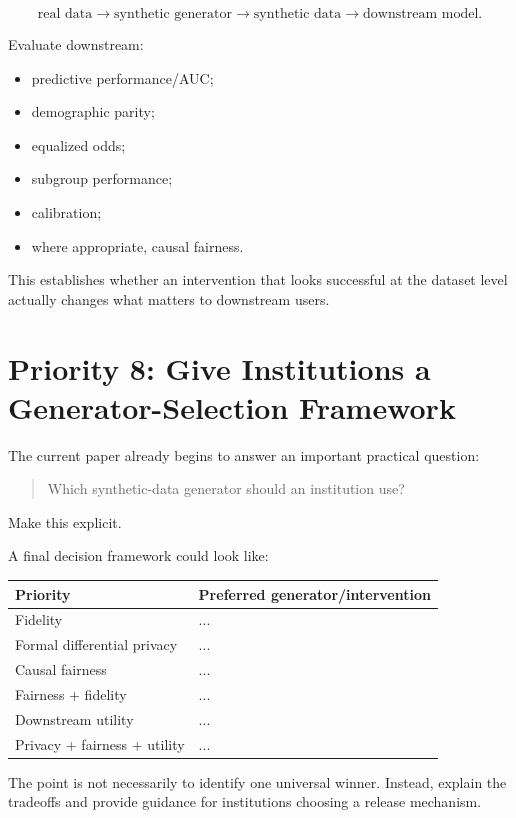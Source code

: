 \documentclass[11pt]{article}
\begin{document}
\[
\text{real data}
\rightarrow
\text{synthetic generator}
\rightarrow
\text{synthetic data}
\rightarrow
\text{downstream model}.
\]

Evaluate downstream:

\begin{itemize}
    \item predictive performance/AUC;
    \item demographic parity;
    \item equalized odds;
    \item subgroup performance;
    \item calibration;
    \item where appropriate, causal fairness.
\end{itemize}

This establishes whether an intervention that looks successful at the dataset level actually changes what matters to downstream users.

\section*{Priority 8: Give Institutions a Generator-Selection Framework}

The current paper already begins to answer an important practical question:

\begin{quote}
Which synthetic-data generator should an institution use?
\end{quote}

Make this explicit.

A final decision framework could look like:

\begin{center}
\begin{tabular}{ll}
\toprule
Priority & Preferred generator/intervention \\
\midrule
Fidelity & ... \\
Formal differential privacy & ... \\
Causal fairness & ... \\
Fairness + fidelity & ... \\
Downstream utility & ... \\
Privacy + fairness + utility & ... \\
\bottomrule
\end{tabular}
\end{center}

The point is not necessarily to identify one universal winner. Instead, explain the tradeoffs and provide guidance for institutions choosing a release mechanism.
\end{document}
